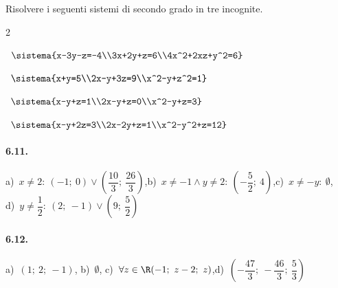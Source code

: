\begin{esercizio}
\label{ese:6.12}
Risolvere i seguenti sistemi di secondo grado in tre incognite.
\begin{htmulticols}{2}
\begin{enumeratea}



\item~\(\sistema{x-3y-z=-4\\3x+2y+z=6\\4x^2+2xz+y^2=6}\)

\item~\(\sistema{x+y=5\\2x-y+3z=9\\x^2-y+z^2=1}\)

\item~\(\sistema{x-y+z=1\\2x-y+z=0\\x^2-y+z=3}\)


\item~\(\sistema{x-y+2z=3\\2x-2y+z=1\\x^2-y^2+z=12}\)
\end{enumeratea}
\end{htmulticols}
\end{esercizio}

\paragraph{6.11.} a)~\(x\neq 2:~\left(-1;~0\right)\vee \left(\dfrac{10} 
3;~\dfrac{26} 3\right)\),\quad b)~\(x\neq -1\wedge y\neq 2:~\left(-\dfrac 
5 
2;~4\right)\),\quad c)~\(x\neq -y:~\emptyset\),\protect\\
\quad d)~\(y\neq \dfrac 1 2:~\left(2;~-1\right)\vee \left(9;~\dfrac 5 
2\right)\)

\paragraph{6.12.} a)~\(\left(1;~2;~-1\right)\),\quad 
b)~\(\emptyset\),\quad 
c)~\(\forall z \in \R (-1;~z-2;~z)\),\quad d)~\(\left(-\dfrac{47} 
3;~-\dfrac{46} 
3;~\dfrac 5 3\right)\)

